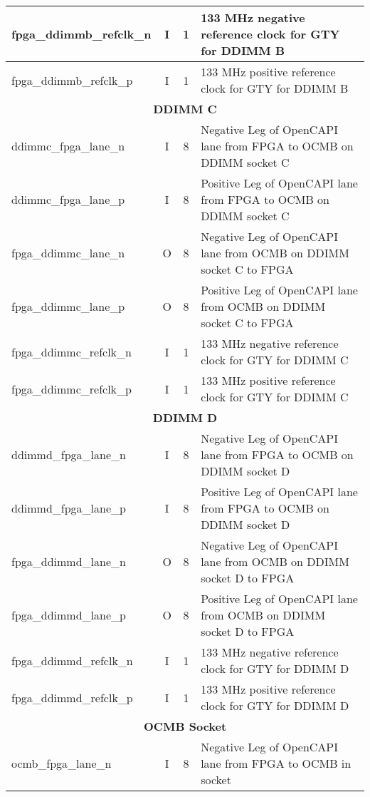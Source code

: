 \begin{center}
\begin{longtable}{ l | c | c | p{.55\linewidth} }
    fpga\_ddimmb\_refclk\_n    & I   & 1    & 133 MHz negative reference clock for GTY for DDIMM B \\ \hline
    fpga\_ddimmb\_refclk\_p    & I   & 1    & 133 MHz positive reference clock for GTY for DDIMM B \\ \hline
    \multicolumn{4}{c}{\textbf{DDIMM C}} \\ \hline
    ddimmc\_fpga\_lane\_n      & I   & 8    & Negative Leg of OpenCAPI lane from FPGA to OCMB on DDIMM socket C \\ \hline
    ddimmc\_fpga\_lane\_p      & I   & 8    & Positive Leg of OpenCAPI lane from FPGA to OCMB on DDIMM socket C \\ \hline
    fpga\_ddimmc\_lane\_n      & O   & 8    & Negative Leg of OpenCAPI lane from OCMB on DDIMM socket C to FPGA \\ \hline
    fpga\_ddimmc\_lane\_p      & O   & 8    & Positive Leg of OpenCAPI lane from OCMB on DDIMM socket C to FPGA \\ \hline
    fpga\_ddimmc\_refclk\_n    & I   & 1    & 133 MHz negative reference clock for GTY for DDIMM C \\ \hline
    fpga\_ddimmc\_refclk\_p    & I   & 1    & 133 MHz positive reference clock for GTY for DDIMM C \\ \hline
    \multicolumn{4}{c}{\textbf{DDIMM D}} \\ \hline
    ddimmd\_fpga\_lane\_n      & I   & 8    & Negative Leg of OpenCAPI lane from FPGA to OCMB on DDIMM socket D \\ \hline
    ddimmd\_fpga\_lane\_p      & I   & 8    & Positive Leg of OpenCAPI lane from FPGA to OCMB on DDIMM socket D \\ \hline
    fpga\_ddimmd\_lane\_n      & O   & 8    & Negative Leg of OpenCAPI lane from OCMB on DDIMM socket D to FPGA \\ \hline
    fpga\_ddimmd\_lane\_p      & O   & 8    & Positive Leg of OpenCAPI lane from OCMB on DDIMM socket D to FPGA \\ \hline
    fpga\_ddimmd\_refclk\_n    & I   & 1    & 133 MHz negative reference clock for GTY for DDIMM D \\ \hline
    fpga\_ddimmd\_refclk\_p    & I   & 1    & 133 MHz positive reference clock for GTY for DDIMM D \\ \hline
    \multicolumn{4}{c}{\textbf{OCMB Socket}} \\ \hline
    ocmb\_fpga\_lane\_n        & I   & 8    & Negative Leg of OpenCAPI lane from FPGA to OCMB in socket \\ \hline

\end{longtable}
\end{center}
